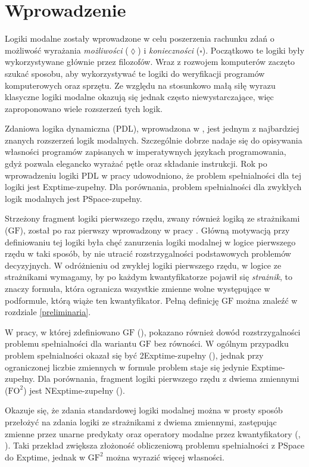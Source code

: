 \documentclass[a4paper]{article}
\begin{document}
\section{Wprowadzenie}
Logiki modalne zostały wprowadzone w celu poszerzenia rachunku zdań o możliwość wyrażania {\it możliwości} ($\lozenge$) i {\it konieczności} ($\square$). Początkowo te logiki były wykorzystywane głównie przez filozofów. Wraz z rozwojem komputerów zaczęto szukać sposobu, aby wykorzystywać te logiki do weryfikacji programów komputerowych oraz sprzętu. Ze względu na stosunkowo małą siłę wyrazu klasyczne logiki modalne okazują się jednak często niewystarczające, więc zaproponowano wiele rozszerzeń tych logik.

Zdaniowa logika dynamiczna (PDL), wprowadzona w \cite{FLA77}, jest jednym z najbardziej znanych rozszerzeń logik modalnych. Szczególnie dobrze nadaje się do opisywania własności programów zapisanych w imperatywnych językach programowania, gdyż pozwala elegancko wyrażać pętle oraz składanie instrukcji. Rok po wprowadzeniu logiki PDL w pracy \cite{PRA78} udowodniono, że problem spełnialności dla tej logiki jest {\sc Exptime}-zupełny. Dla porównania, problem spełnialności dla zwykłych logik modalnych jest {\sc PSpace}-zupełny.

Strzeżony fragment logiki pierwszego rzędu, zwany również logiką ze strażnikami ($\mathrm{GF}$), został po raz pierwszy wprowadzony w pracy \cite{ANB96}. Główną motywacją przy definiowaniu tej logiki była chęć zanurzenia logiki modalnej w logice pierwszego rzędu w taki sposób, by nie utracić rozstrzygalności podstawowych problemów decyzyjnych. W odróżnieniu od zwykłej logiki pierwszego rzędu, w logice ze strażnikami wymagamy, by po każdym kwantyfikatorze pojawił się {\it strażnik}, to znaczy formuła, która ogranicza wszystkie zmienne wolne występujące w podformule, którą wiąże ten kwantyfikator. Pełną definicję $\mathrm{GF}$ można znaleźć w rozdziale \ref{preliminaria}.

W pracy, w której zdefiniowano $\mathrm{GF}$ (\cite{ANB96}), pokazano również dowód rozstrzygalności problemu spełnialności dla wariantu $\mathrm{GF}$ bez równości. W ogólnym przypadku problem spełnialności okazał się być {\sc 2Exptime}-zupełny (\cite{GRA98}), jednak przy ograniczonej liczbie zmiennych w formule problem staje się jedynie {\sc Exptime}-zupełny. Dla porównania, fragment logiki pierwszego rzędu z dwiema zmiennymi ($\mathrm{FO^2}$) jest {\sc NExptime}-zupełny (\cite{GKV97}).

Okazuje się, że zdania standardowej logiki modalnej można w prosty sposób przełożyć na zdania logiki ze strażnikami z dwiema zmiennymi, zastępując zmienne przez unarne predykaty oraz operatory modalne przez kwantyfikatory (\cite{BEN76}, \cite{BEN84}). Taki przekład zwiększa złożoność obliczeniową problemu spełnialności z {\sc PSpace} do {\sc Exptime}, jednak w $\mathrm{GF^2}$ można wyrazić więcej własności. 
\end{document}
